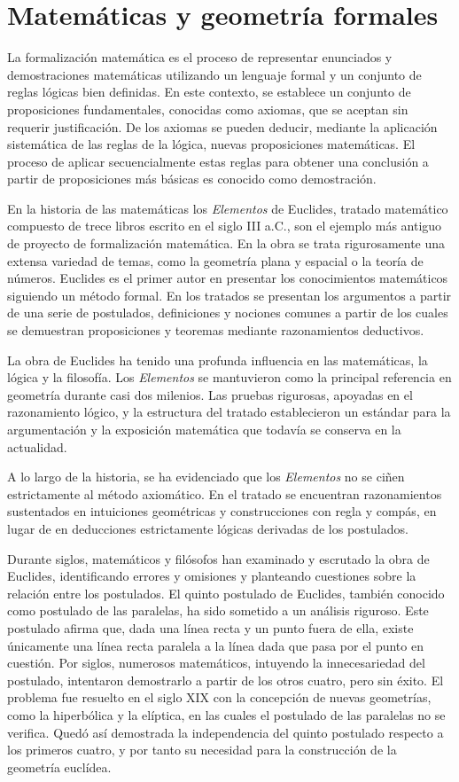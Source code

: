 \section{Matemáticas y geometría formales}

La formalización matemática es el proceso de representar enunciados y
demostraciones matemáticas utilizando un lenguaje formal y un conjunto de reglas
lógicas bien definidas. En este contexto, se establece un conjunto de
proposiciones fundamentales, conocidas como axiomas, que se aceptan sin requerir
justificación. De los axiomas se pueden deducir, mediante la aplicación
sistemática de las reglas de la lógica, nuevas proposiciones matemáticas. El
proceso de aplicar secuencialmente estas reglas para obtener una conclusión a
partir de proposiciones más básicas es conocido como demostración.

En la historia de las matemáticas los \textit{Elementos} de Euclides, tratado
matemático compuesto de trece libros escrito en el siglo III a.C., son el
ejemplo más antiguo de proyecto de formalización matemática. En la obra se trata
rigurosamente una extensa variedad de temas, como la geometría plana y espacial
o la teoría de números. Euclides es el primer autor en presentar los
conocimientos matemáticos siguiendo un método formal. En los tratados se
presentan los argumentos a partir de una serie de postulados, definiciones y
nociones comunes a partir de los cuales se demuestran proposiciones y teoremas
mediante razonamientos deductivos.

La obra de Euclides ha tenido una profunda influencia en las matemáticas, la
lógica y la filosofía. Los \textit{Elementos} se mantuvieron como la principal
referencia en geometría durante casi dos milenios. Las pruebas rigurosas,
apoyadas en el razonamiento lógico, y la estructura del tratado establecieron un
estándar para la argumentación y la exposición matemática que todavía se
conserva en la actualidad.

A lo largo de la historia, se ha evidenciado que los \textit{Elementos} no se
ciñen estrictamente al método axiomático. En el tratado se encuentran
razonamientos sustentados en intuiciones geométricas y construcciones con regla
y compás, en lugar de en deducciones estrictamente lógicas derivadas de los
postulados.

Durante siglos, matemáticos y filósofos han examinado y escrutado la obra de
Euclides, identificando errores y omisiones y planteando cuestiones sobre la
relación entre los postulados. El quinto postulado de Euclides, también conocido
como postulado de las paralelas, ha sido sometido a un análisis riguroso. Este
postulado afirma que, dada una línea recta y un punto fuera de ella, existe
únicamente una línea recta paralela a la línea dada que pasa por el punto en
cuestión. Por siglos, numerosos matemáticos, intuyendo la innecesariedad del
postulado, intentaron demostrarlo a partir de los otros cuatro, pero sin éxito.
El problema fue resuelto en el siglo XIX con la concepción de nuevas geometrías,
como la hiperbólica y la elíptica, en las cuales el postulado de las paralelas
no se verifica. Quedó así demostrada la independencia del quinto postulado
respecto a los primeros cuatro, y por tanto su necesidad para la construcción de
la geometría euclídea.

